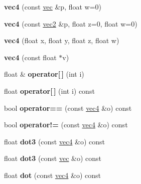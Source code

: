 \begin{DoxyCompactItemize}
\item 
\mbox{\label{structvec4_acceaf8b27dc017a5f378750b3dbff2b7}} 
{\bfseries vec4} (const \hyperlink{structvec}{vec} \&p, float w=0)
\item 
\mbox{\label{structvec4_a3f6d08b2c183265b6604e7c82f29919e}} 
{\bfseries vec4} (const \hyperlink{structvec2}{vec2} \&p, float z=0, float w=0)
\item 
\mbox{\label{structvec4_a4174b718621ba5b473ea2c289f11fe46}} 
{\bfseries vec4} (float x, float y, float z, float w)
\item 
\mbox{\label{structvec4_a0c93b3cbb9136b1c9327cfacb8842f17}} 
{\bfseries vec4} (const float $\ast$v)
\item 
\mbox{\label{structvec4_a79c669aa0441db4a65a1297c7562d7ae}} 
float \& {\bfseries operator\mbox{[}$\,$\mbox{]}} (int i)
\item 
\mbox{\label{structvec4_a8375df602a39989647bac988dcec6a4f}} 
float {\bfseries operator\mbox{[}$\,$\mbox{]}} (int i) const
\item 
\mbox{\label{structvec4_aa1403a340c66d99a05a35758618f7414}} 
bool {\bfseries operator==} (const \hyperlink{structvec4}{vec4} \&o) const
\item 
\mbox{\label{structvec4_ad772e9df2d375caa93fdcf0eee582bbd}} 
bool {\bfseries operator!=} (const \hyperlink{structvec4}{vec4} \&o) const
\item 
\mbox{\label{structvec4_abc3a210456d574eb243052955469fd51}} 
float {\bfseries dot3} (const \hyperlink{structvec4}{vec4} \&o) const
\item 
\mbox{\label{structvec4_a85d9cc4645daa9726b8e2592ac6e0a79}} 
float {\bfseries dot3} (const \hyperlink{structvec}{vec} \&o) const
\item 
\mbox{\label{structvec4_a553155ef356fa3eb92a55a24e74eea84}} 
float {\bfseries dot} (const \hyperlink{structvec4}{vec4} \&o) const

\end{DoxyCompactItemize}
